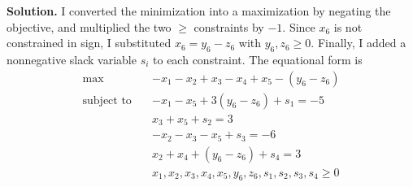 \documentclass[11pt]{article}
\begin{document}
\medskip
\noindent\textbf{Solution.}
I converted the minimization into a maximization by negating the objective, and multiplied the two $\ge$ constraints by $-1$. Since $x_6$ is not constrained in sign, I substituted $x_6 = y_6 - z_6$ with $y_6, z_6 \ge 0$. Finally, I added a nonnegative slack variable $s_i$ to each constraint. The equational form is
\begin{align*}
\max\quad & -x_1 - x_2 + x_3 - x_4 + x_5 - (y_6 - z_6) \\
\text{subject to}\quad & -x_1 - x_5 + 3(y_6 - z_6) + s_1 = -5 \\
& x_3 + x_5 + s_2 = 3 \\
& -x_2 - x_3 - x_5 + s_3 = -6 \\
& x_2 + x_4 + (y_6 - z_6) + s_4 = 3 \\
& x_1, x_2, x_3, x_4, x_5, y_6, z_6, s_1, s_2, s_3, s_4 \ge 0
\end{align*}
\end{document}
